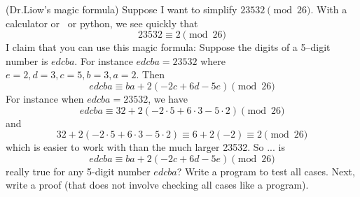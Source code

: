 (Dr.Liow's magic formula)
  Suppose I want to simplify $23532 \pmod{26}$.
  With a calculator or \cpp\ or python, we see quickly that
  \[
    23532 \equiv 2 \pmod{26}
  \]
  I claim that you can use this magic formula:
  Suppose the digits of a 5--digit number is $edcba$.
  For instance $edcba = 23532$ where $e = 2, d = 3, c = 5, b = 3, a = 2$.
  Then
  \[
    edcba \equiv ba + 2(-2c + 6d - 5e) \pmod{26}
  \]
  For instance when $edcba = 23532$, we have
  \[
    edcba \equiv 32 + 2(-2\cdot 5 + 6 \cdot 3 - 5 \cdot 2) \pmod{26}
  \]
  and
  \[
    32 + 2(-2\cdot 5 + 6 \cdot 3 - 5 \cdot 2) \equiv 6 + 2(-2) \equiv 2 \pmod{26}
  \]
  which is easier to work with than
  the much larger 23532.
  So ... is
  \[
    edcba \equiv ba + 2(-2c + 6d - 5e) \pmod{26}
  \]
  really true for any 5-digit number $edcba$? Write a program to test all cases.
  Next, write a proof (that does not involve checking all cases like a program).

